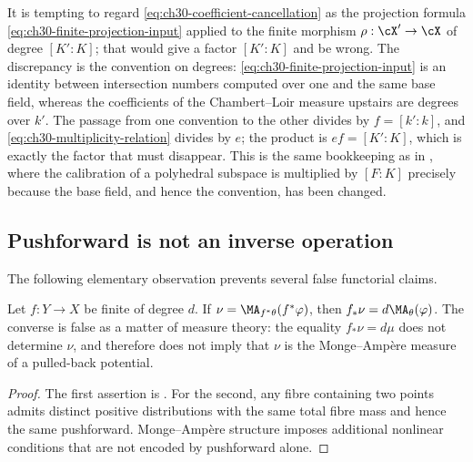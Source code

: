 \begin{remark}
\label{rem:ch30-two-inputs}
It is tempting to regard \eqref{eq:ch30-coefficient-cancellation} as the
projection formula \eqref{eq:ch30-finite-projection-input} applied to the
finite morphism \(\rho:\cX'\to\cX\) of degree \([K':K]\); that would give a
factor \([K':K]\) and be wrong.  The discrepancy is the convention on
degrees: \eqref{eq:ch30-finite-projection-input} is an identity between
intersection numbers computed over one and the same base field, whereas the
coefficients of the Chambert--Loir measure upstairs are degrees over
\(k'\).  The passage from one convention to the other divides by
\(f=[k':k]\), and \eqref{eq:ch30-multiplicity-relation} divides by
\(e\); the product is \(ef=[K':K]\), which is exactly the factor that must
disappear.  This is the same bookkeeping as in
, where the calibration of a
polyhedral subspace is multiplied by \([F:K]\) precisely because the base
field, and hence the convention, has been changed.
\end{remark}

\subsection{Pushforward is not an inverse operation}
\label{sec:ch30-not-inverse}

The following elementary observation prevents several false functorial
claims.

\begin{proposition}
\label{prop:ch30-pushforward-not-inverse}
Let \(f:Y\to X\) be finite of degree \(d\).  If
\(\nu=\MA_{f^*\theta}(f^*\varphi)\), then
\(f_*\nu=d\MA_\theta(\varphi)\).  The converse is false as a matter of
measure theory: the equality \(f_*\nu=d\mu\) does not determine \(\nu\),
and therefore does not imply that \(\nu\) is the Monge--Amp\`ere measure of
a pulled-back potential.
\end{proposition}

\begin{proof}
The first assertion is .  For the
second, any fibre containing two points admits distinct positive
distributions with the same total fibre mass and hence the same pushforward.
Monge--Amp\`ere structure imposes additional nonlinear conditions that are
not encoded by pushforward alone.
\end{proof}

